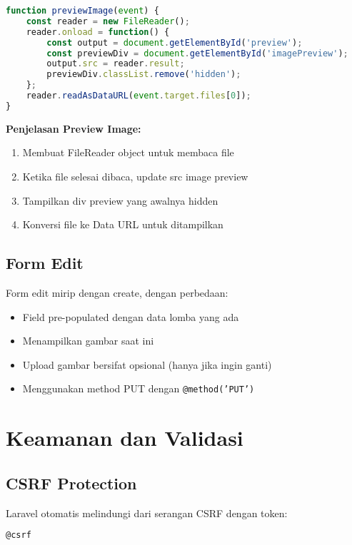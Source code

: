 \documentclass[12pt,a4paper]{article}
\begin{document}
\begin{lstlisting}[language=JavaScript]
function previewImage(event) {
    const reader = new FileReader();
    reader.onload = function() {
        const output = document.getElementById('preview');
        const previewDiv = document.getElementById('imagePreview');
        output.src = reader.result;
        previewDiv.classList.remove('hidden');
    };
    reader.readAsDataURL(event.target.files[0]);
}
\end{lstlisting}

\textbf{Penjelasan Preview Image:}
\begin{enumerate}
    \item Membuat FileReader object untuk membaca file
    \item Ketika file selesai dibaca, update src image preview
    \item Tampilkan div preview yang awalnya hidden
    \item Konversi file ke Data URL untuk ditampilkan
\end{enumerate}

\subsection{Form Edit}

Form edit mirip dengan create, dengan perbedaan:
\begin{itemize}
    \item Field pre-populated dengan data lomba yang ada
    \item Menampilkan gambar saat ini
    \item Upload gambar bersifat opsional (hanya jika ingin ganti)
    \item Menggunakan method PUT dengan \texttt{@method('PUT')}
\end{itemize}

\section{Keamanan dan Validasi}

\subsection{CSRF Protection}

Laravel otomatis melindungi dari serangan CSRF dengan token:

\begin{lstlisting}[language=HTML]
@csrf
\end{lstlisting}
\end{document}
